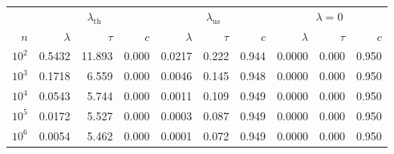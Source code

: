 \begin{tabular}{rrrrrrrrrr}
\hline
 & \multicolumn{3}{c}{$\lambda_{\mathrm{th}}$} & \multicolumn{3}{c}{$\lambda_{\mathrm{us}}$} & \multicolumn{3}{c}{$\lambda=0$} \\
$n$ & $\lambda$ & $\tau$ & $c$ & $\lambda$ & $\tau$ & $c$ & $\lambda$ & $\tau$ & $c$ \\
\hline
$10^{2}$ & 0.5432 & 11.893 & 0.000 & 0.0217 & 0.222 & 0.944 & 0.0000 & 0.000 & 0.950 \\
$10^{3}$ & 0.1718 & 6.559 & 0.000 & 0.0046 & 0.145 & 0.948 & 0.0000 & 0.000 & 0.950 \\
$10^{4}$ & 0.0543 & 5.744 & 0.000 & 0.0011 & 0.109 & 0.949 & 0.0000 & 0.000 & 0.950 \\
$10^{5}$ & 0.0172 & 5.527 & 0.000 & 0.0003 & 0.087 & 0.949 & 0.0000 & 0.000 & 0.950 \\
$10^{6}$ & 0.0054 & 5.462 & 0.000 & 0.0001 & 0.072 & 0.949 & 0.0000 & 0.000 & 0.950 \\
\hline
\end{tabular}
